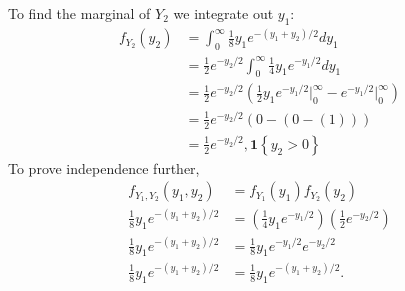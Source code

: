 \documentclass[11pt]{article}
\theoremstyle{definition}
\newcommand{\1}[1]{\mathbf{1} \left \{ #1 \right \}}
\begin{document}
To find the marginal of $Y_2$ we integrate out $y_1$:
\begin{align*}
    f_{Y_2} (y_2) &= \int_0^{\infty} \frac{1}{8} y_1 e^{-(y_1 + y_2)/2} dy_1 \\
    &= \frac{1}{2} e^{-y_2/2} \int_0^{\infty} \frac{1}{4} y_1 e^{-y_1/2} dy_1 \\
    &= \frac{1}{2} e^{-y_2/2} \left(\frac{1}{2} y_1 e^{-y_1/2} \Big|_0^{\infty} - e^{-y_1/2} \Big|_0^{\infty} \right) \\
    &= \frac{1}{2} e^{-y_2/2} (0 - (0 - (1))) \\
    &= \frac{1}{2} e^{-y_2/2}, \1{y_2 >0}
\end{align*}
To prove independence further,
\begin{align*}
    f_{Y_1,Y_2} (y_1, y_2) &= f_{Y_1} (y_1) f_{Y_2} (y_2) \\
    \frac{1}{8} y_1 e^{-(y_1 + y_2)/2} &= \left(\frac{1}{4} y_1 e^{-y_1/2}\right) \left(\frac{1}{2} e^{-y_2/2}\right) \\
    \frac{1}{8} y_1 e^{-(y_1 + y_2)/2} &= \frac{1}{8} y_1 e^{-y_1/2} e^{-y_2/2} \\
    \frac{1}{8} y_1 e^{-(y_1 + y_2)/2} &= \frac{1}{8} y_1 e^{-(y_1 + y_2)/2}.
\end{align*}
\end{document}
